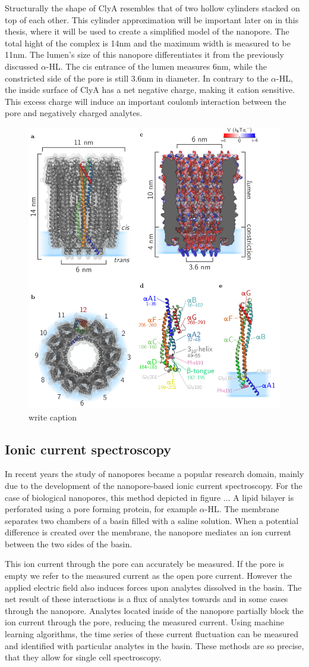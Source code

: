 Structurally the shape of ClyA resembles that of two hollow cylinders stacked on top of
each other. This cylinder approximation will be important later on in this thesis, where
it will be used to create a simplified model of the nanopore. The total hight of the
complex is
14nm and the maximum width is measured to be 11nm. The lumen's size of this nanopore
differentiates it from the previously discussed $\alpha$-HL. The cis entrance of the
lumen measures 6nm, while the constricted side of the pore is still 3.6nm in diameter. In
contrary to the $\alpha$-HL, the inside surface of ClyA has a net negative charge,
making it cation sensitive. This excess charge will induce an important
 coulomb interaction between the pore and negatively charged analytes.


\begin{figure}[h!]
  \centering
  \includegraphics[width=0.5\linewidth]{Figures/cytolysinA.png}
  \caption{write caption}
  \label{adassf}
\end{figure}

\subsection{Ionic current spectroscopy}
In recent years the study of nanopores became a popular research domain, mainly
due to the development of the nanopore-based ionic current spectroscopy. For the case of
biological nanopores, this method depicted in figure ... A lipid bilayer is perforated
using a pore forming protein, for example $\alpha$-HL. The membrane separates two
chambers of a basin filled with a saline solution. When a potential difference is created
over the membrane, the nanopore mediates an ion current between the two sides of the
basin.

This ion current through the pore can accurately be measured. If the pore is empty we
refer to the measured current as the open pore current.  However the applied electric
field also induces forces upon analytes dissolved in the basin. The net result of these
interactions is a flux of analytes towards and in some cases through the nanopore.
Analytes located inside of the nanopore partially block the ion current through the pore,
reducing the measured current. Using machine learning algorithms, the time series of
these current fluctuation can be measured and identified with particular analytes in the
basin. These methods are so precise, that they allow for single cell spectroscopy.

